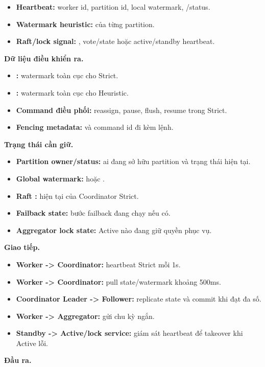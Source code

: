 \documentclass[12pt,a4paper]{article}
\begin{document}
\begin{itemize}
\item \textbf{Heartbeat:} worker id, partition id, local watermark, /status.
\item \textbf{Watermark heuristic:}  của từng partition.
\item \textbf{Raft/lock signal:} , vote/state hoặc active/standby heartbeat.
\end{itemize}
\textbf{Dữ liệu điều khiển ra.}

\begin{itemize}
\item \textbf{:} watermark toàn cục cho Strict.
\item \textbf{:} watermark toàn cục cho Heuristic.
\item \textbf{Command điều phối:} reassign, pause, flush, resume trong Strict.
\item \textbf{Fencing metadata:}  và command id đi kèm lệnh.
\end{itemize}
\textbf{Trạng thái cần giữ.}

\begin{itemize}
\item \textbf{Partition owner/status:} ai đang sở hữu partition và trạng thái hiện tại.
\item \textbf{Global watermark:}  hoặc .
\item \textbf{Raft :}  hiện tại của Coordinator Strict.
\item \textbf{Failback state:} bước failback đang chạy nếu có.
\item \textbf{Aggregator lock state:} Active nào đang giữ quyền phục vụ.
\end{itemize}
\textbf{Giao tiếp.}

\begin{itemize}
\item \textbf{Worker -> Coordinator:} heartbeat Strict mỗi 1s.
\item \textbf{Worker -> Coordinator:} pull state/watermark khoảng 500ms.
\item \textbf{Coordinator Leader -> Follower:} replicate state và commit khi đạt đa số.
\item \textbf{Worker -> Aggregator:} gửi  chu kỳ ngắn.
\item \textbf{Standby -> Active/lock service:} giám sát heartbeat để takeover khi Active lỗi.
\end{itemize}
\textbf{Đầu ra.}
\end{document}
